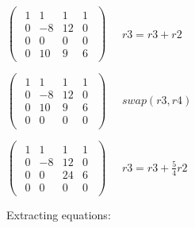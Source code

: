 \singlespacing

\begin{math}
    \begin{pmatrix}
        \begin{array}{ccc|c}
            1 & 1  & 1  & 1 \\
            0 & -8 & 12 & 0 \\
            0 & 0  & 0  & 0 \\
            0 & 10 & 9  & 6
        \end{array}
    \end{pmatrix}\quad
    \begin{array}{c}
        r3 = r3  + r2
    \end{array}
\end{math}

\singlespacing

\begin{math}
    \begin{pmatrix}
        \begin{array}{ccc|c}
            1 & 1  & 1  & 1 \\
            0 & -8 & 12 & 0 \\
            0 & 10 & 9  & 6 \\
            0 & 0  & 0  & 0
        \end{array}
    \end{pmatrix}\quad
    \begin{array}{c}
        swap(r3, r4)
    \end{array}
\end{math}

\singlespacing

\begin{math}
    \begin{pmatrix}
        \begin{array}{ccc|c}
            1 & 1  & 1  & 1 \\
            0 & -8 & 12 & 0 \\
            0 & 0  & 24 & 6 \\
            0 & 0  & 0  & 0
        \end{array}
    \end{pmatrix}\quad
    \begin{array}{c}
        r3 = r3 + \frac{5}{4}r2
    \end{array}
\end{math}

\singlespacing

Extracting equations:

